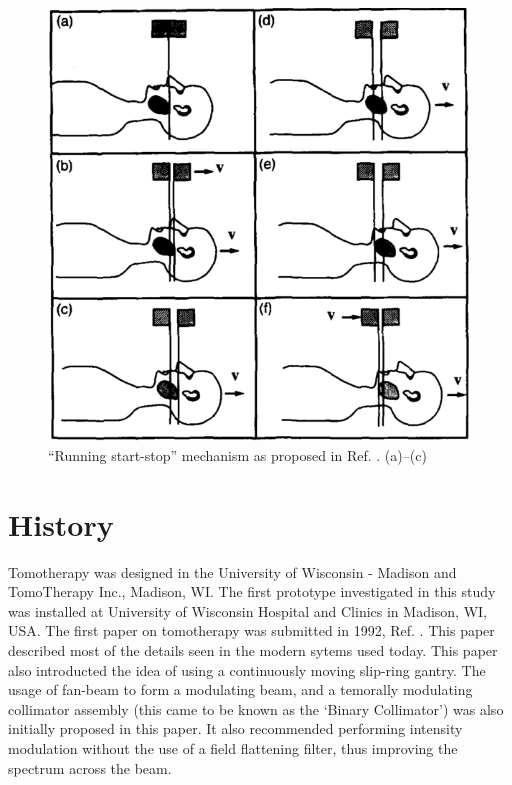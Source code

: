 \documentclass[10pt,journal,compsoc]{IEEEtran} %
\begin{document}
\begin{figure}[htbp!]
  \centering
  \includegraphics[width=0.9\linewidth]{fig2}
  \caption{``Running start-stop'' mechanism as proposed in Ref. 
    \cite{Mackie1993}. (a)--(c) }
  \label{fig2}
  
\end{figure}
  \section{History}
  \label{history}
  Tomotherapy was designed in the University of Wisconsin - Madison and 
  TomoTherapy Inc., Madison, WI. The first prototype investigated in this study 
  was installed at University of Wisconsin Hospital and Clinics in Madison, WI, 
  USA. The first paper on tomotherapy was submitted in 1992, Ref. 
  \cite{Mackie1993}. This paper described most of the details seen in the 
  modern sytems used today. This paper also introducted the idea of using a 
  continuously moving slip-ring gantry. The usage of fan-beam to form a 
  modulating beam, and a temorally modulating collimator assembly (this came 
  to be known as the `Binary Collimator') was also initially proposed in this 
  paper. It also recommended performing 
  intensity modulation without the use of a field flattening filter, thus 
  improving the spectrum across the beam.
  
\end{document}
